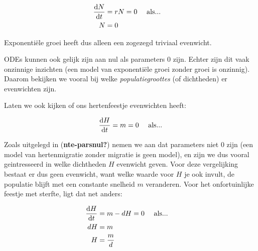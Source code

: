 \documentclass[
  a4paper,
]{scrbook}
\theoremstyle{definition}
\theoremstyle{remark}
\begin{document}
\begin{align*}
    \mathchoice{\frac{\mathrm{d}N}
{\mathrm{d}t}}{\mathrm{d}N/\mathrm{d}t}
{\mathrm{d}N/\mathrm{d}t}
{\mathrm{d}N/\mathrm{d}t} &= rN = 0 \quad \text{ als...}\\
    N &= 0 &
\end{align*}

Exponentiële groei heeft dus alleen een zogezegd triviaal evenwicht.

\begin{tcolorbox}[enhanced jigsaw, coltitle=black, breakable, bottomtitle=1mm, opacityback=0, colback=white, rightrule=.15mm, title=\textcolor{quarto-callout-caution-color}{\faFire}\hspace{0.5em}{Parameters zijn niet nul}, bottomrule=.15mm, toprule=.15mm, left=2mm, colframe=quarto-callout-caution-color-frame, toptitle=1mm, opacitybacktitle=0.6, titlerule=0mm, colbacktitle=quarto-callout-caution-color!10!white, leftrule=.75mm, arc=.35mm]

ODEs kunnen ook gelijk zijn aan nul als parameters 0 zijn. Echter zijn
dit vaak onzinnige inzichten (een model van exponentiële groei zonder
groei is onzinnig). Daarom bekijken we vooral bij welke
\emph{populatiegroottes} (of dichtheden) er evenwichten zijn.

\end{tcolorbox}

Laten we ook kijken of ons hertenfeestje evenwichten heeft:

\begin{align*}
    \mathchoice{\frac{\mathrm{d}H}
{\mathrm{d}t}}{\mathrm{d}H/\mathrm{d}t}
{\mathrm{d}H/\mathrm{d}t}
{\mathrm{d}H/\mathrm{d}t} &= m = 0 \quad \text{ als...}\\
\end{align*}

Zoals uitgelegd in (\textbf{nte-parsnul?}) nemen we aan dat parameters
niet \(0\) zijn (een model van hertenmigratie zonder migratie is geen
model), en zijn we dus vooral geintresseerd in welke dichtheden \(H\)
evenwicht geven. Voor deze vergelijking bestaat er dus geen evenwicht,
want welke waarde voor \(H\) je ook invult, de populatie blijft met een
constante snelheid \(m\) veranderen. Voor het onfortuinlijke feestje met
sterfte, ligt dat net anders:

\begin{align*}
    \mathchoice{\frac{\mathrm{d}H}
{\mathrm{d}t}}{\mathrm{d}H/\mathrm{d}t}
{\mathrm{d}H/\mathrm{d}t}
{\mathrm{d}H/\mathrm{d}t} &= m - dH = 0 \quad \text{ als...}\\
    dH &= m & \\
    H &= \frac{m}{d} &
\end{align*}
\end{document}
